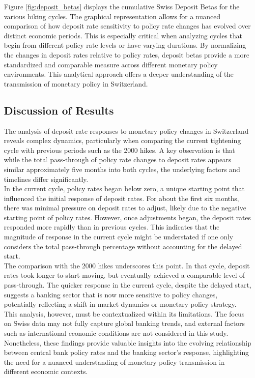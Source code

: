 \documentclass{article}
\begin{document}
Figure \ref{fig:deposit_betas} displays the cumulative Swiss Deposit Betas for the various hiking cycles. The graphical representation allows for a nuanced comparison of how deposit rate sensitivity to policy rate changes has evolved over distinct economic periods. This is especially critical when analyzing cycles that begin from different policy rate levels or have varying durations. By normalizing the changes in deposit rates relative to policy rates, deposit betas provide a more standardized and comparable measure across different monetary policy environments. This analytical approach offers a deeper understanding of the transmission of monetary policy in Switzerland.

\subsection{Discussion of Results}

The analysis of deposit rate responses to monetary policy changes in Switzerland reveals complex dynamics, particularly when comparing the current tightening cycle with previous periods such as the 2000 hikes. A key observation is that while the total pass-through of policy rate changes to deposit rates appears similar approximately five months into both cycles, the underlying factors and timelines differ significantly.\\

In the current cycle, policy rates began below zero, a unique starting point that influenced the initial response of deposit rates. For about the first six months, there was minimal pressure on deposit rates to adjust, likely due to the negative starting point of policy rates. However, once adjustments began, the deposit rates responded more rapidly than in previous cycles. This indicates that the magnitude of response in the current cycle might be understated if one only considers the total pass-through percentage without accounting for the delayed start.\\

The comparison with the 2000 hikes underscores this point. In that cycle, deposit rates took longer to start moving, but eventually achieved a comparable level of pass-through. The quicker response in the current cycle, despite the delayed start, suggests a banking sector that is now more sensitive to policy changes, potentially reflecting a shift in market dynamics or monetary policy strategy.\\

This analysis, however, must be contextualized within its limitations. The focus on Swiss data may not fully capture global banking trends, and external factors such as international economic conditions are not considered in this study. Nonetheless, these findings provide valuable insights into the evolving relationship between central bank policy rates and the banking sector's response, highlighting the need for a nuanced understanding of monetary policy transmission in different economic contexts.\\
\end{document}

